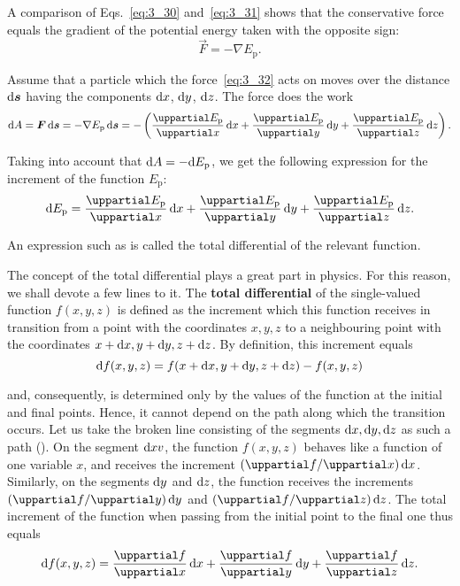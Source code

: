 A comparison of Eqs.~\eqref{eq:3_30} and~\eqref{eq:3_31} shows that the conservative force equals the gradient of the potential energy taken with the opposite sign:
\begin{equation}\label{eq:3_32}
\vec{F} = -\nabla E_{\text{p}}.
\end{equation}

Assume that a particle which the force~\eqref{eq:3_32} acts on moves over the distance $\mathrm{d}\boldsymbol{s}$ having the components $\mathrm{d} x$, $\mathrm{d} y$, $\mathrm{d} z$. The force does the work
\begin{equation*}
\deriv{A} = \vec{F}\,\deriv{\vec{s}} = -\nabla E_{\text{p}}\,\deriv{\vec{s}} = - \left(\diffpartial{E_{\text{p}}}{x}\,\deriv{x} + \diffpartial{E_{\text{p}}}{y}\,\deriv{y} +  \diffpartial{E_{\text{p}}}{z}\,\deriv{z}\right).
\end{equation*}

\noindent
Taking into account that $\mathrm{d} A=-\mathrm{d} E_{\text{p}}$, we get the following expression for the increment of the function $E_{\text{p}}$:
\begin{equation}\label{eq:3_33}
\deriv{E_{\text{p}}} = \diffpartial{E_{\text{p}}}{x}\,\deriv{x} + \diffpartial{E_{\text{p}}}{y}\,\deriv{y} +  \diffpartial{E_{\text{p}}}{z}\,\deriv{z}.
\end{equation}

\noindent
An expression such as  is called the total differential of the relevant function.

The concept of the total differential plays a great part in physics. For this reason, we shall devote a few lines to it. The \textbf{total differential} of the single-valued function $f(x,y,z)$ is defined as the increment which this function receives in transition from a point with the coordinates $x,y,z$ to a neighbouring point with the coordinates $x+\mathrm{d} x, y+\mathrm{d} y, z+\mathrm{d} z$. By definition, this increment equals
\begin{equation*}
\mathrm{d} f(x,y,z) = f(x+\mathrm{d} x, y+\mathrm{d} y, z+\mathrm{d} z) - f(x,y,z) 
\end{equation*}

\noindent
and, consequently, is determined only by the values of the function at the initial and final points. Hence, it cannot depend on the path along which the transition occurs. Let us take the broken line consisting of the segments $\mathrm{d} x, \mathrm{d} y, \mathrm{d} z$ as such a path (). On the segment $\mathrm{d} xv$, the function $f(x,y,z)$ behaves like a function of one variable $x$, and receives the increment $(\diffinpartial{f}{x})\,\deriv{x}$. Similarly, on the segments $\mathrm{d} y$ and $\mathrm{d} z$, the function receives the increments $(\diffinpartial{f}{y})\,\deriv{y}$ and $(\diffinpartial{f}{z})\,\deriv{z}$. The total increment of the function when passing from the initial point to the final one thus equals
\begin{equation}\label{eq:3_34}
\deriv{f}(x,y,z)  = \diffpartial{f}{x}\,\deriv{x} + \diffpartial{f}{y}\,\deriv{y} +  \diffpartial{f}{z}\,\deriv{z}.
\end{equation}

